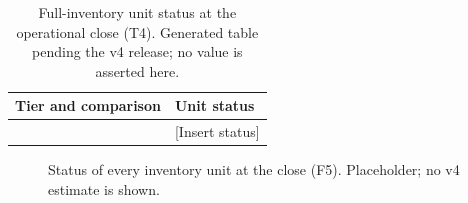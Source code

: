\begin{table}[t]
\caption{Full-inventory unit status at the operational close (T4). Generated table pending the v4 release; no value is asserted here.}\label{tab:v4-T4}
\centering\begin{tabular}{ll}\hline
Tier and comparison & Unit status \\\hline
[Insert generated rows] & [Insert status] \\\hline
\end{tabular}
\end{table}
\begin{figure}[t]
\centering{}
\caption{Status of every inventory unit at the close (F5). Placeholder; no v4 estimate is shown.}\label{fig:v4-F5}
\end{figure}
